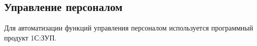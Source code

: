 \subsection{Управление персоналом}
%
Для автоматизации функций управления персоналом используется программный продукт 1С:ЗУП.
